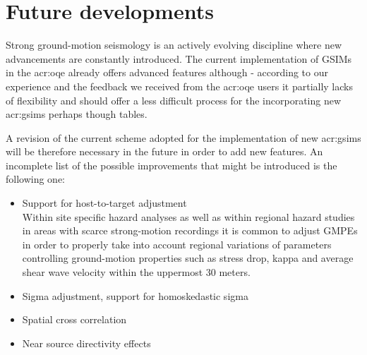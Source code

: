 %
\section{Future developments}
%
Strong ground-motion seismology is an actively evolving discipline where
new advancements are constantly introduced.  
%
The current implementation of GSIMs in the \gls{acr:oqe} already offers advanced
features although - according to our experience and the feedback we received
from the \gls{acr:oqe} users it partially lacks of flexibility and should offer
a less difficult process for the incorporating new \glspl{acr:gsim} perhaps
though tables. 

A revision of the current scheme adopted for the implementation of new 
\glspl{acr:gsim} will be therefore necessary in the future in order to add
new features. 
%
An incomplete list of the possible improvements that might be introduced 
is the following one:
%
\begin{itemize}
\item Support for host-to-target adjustment \hfill \\
    Within site specific hazard analyses \citep[see for example][]{bommer2014}
    as well as within regional hazard studies in areas with scarce strong-motion
    recordings it is common to adjust GMPEs in order to properly take into
    account regional variations of parameters controlling ground-motion
    properties such as stress drop, kappa and average shear wave velocity within
    the uppermost 30 meters.
\item Sigma adjustment, support for homoskedastic sigma \hfill \\ 

\item Spatial cross correlation \hfill \\
    
\item Near source directivity effects \hfill \\
\end{itemize}
